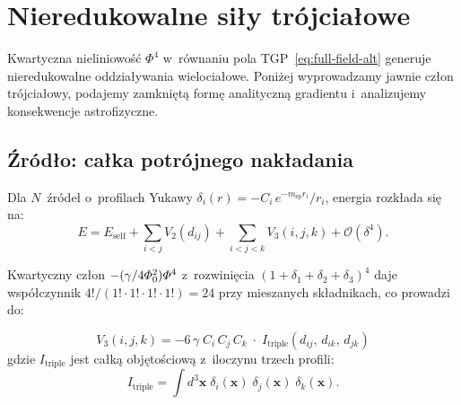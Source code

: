 \section{Nieredukowalne si\l{}y tr\'ojcia\l{}owe}%
\label{app:three-body}

Kwartyczna nieliniowo\'s\'c $\Phi^4$ w~r\'ownaniu pola
TGP~\eqref{eq:full-field-alt} generuje
nieredukowalne oddzia\l{}ywania wielocia\l{}owe.
Poni\.zej wyprowadzamy jawnie cz\l{}on tr\'ojcia\l{}owy,
podajemy zamkni\k{e}t\k{a} form\k{e} analityczn\k{a} gradientu
i~analizujemy konsekwencje astrofizyczne.

\subsection{\'Zr\'od\l{}o: ca\l{}ka potr\'ojnego nak\l{}adania}

Dla $N$~\'zr\'ode\l{} o~profilach Yukawy
$\delta_i(r) = -C_i\,e^{-m_{\mathrm{sp}} r_i}/r_i$,
energia rozk\l{}ada si\k{e} na:
\begin{equation}\label{eq:energy-3b-decomp}
  E = E_{\mathrm{self}}
    + \sum_{i<j} V_2(d_{ij})
    + \sum_{i<j<k} V_3(i,j,k)
    + \mathcal{O}(\delta^4).
\end{equation}

Kwartyczny cz\l{}on $-(\gamma/4\varPhi_0^2)\varPhi^4$ z~rozwini\k{e}cia
$(1+\delta_1+\delta_2+\delta_3)^4$ daje wsp\'o\l{}czynnik
$4!/(1!\cdot1!\cdot1!\cdot1!) = 24$ przy mieszanych sk\l{}adnikach,
co prowadzi do:

\begin{proposition}%
\label{prop:V3-def}
\begin{equation}\label{eq:V3-main}
  \boxed{
    V_3(i,j,k) = -6\,\gamma\;C_i\,C_j\,C_k
    \;\cdot\; I_{\mathrm{triple}}(d_{ij},\, d_{ik},\, d_{jk})
  }
\end{equation}
gdzie $I_{\mathrm{triple}}$ jest ca\l{}k\k{a} obj\k{e}to\'sciow\k{a}
z~iloczynu trzech profili:
\begin{equation}
  I_{\mathrm{triple}} = \int d^3\mathbf{x}\;
  \delta_i(\mathbf{x})\;\delta_j(\mathbf{x})\;\delta_k(\mathbf{x}).
\end{equation}
\end{proposition}

